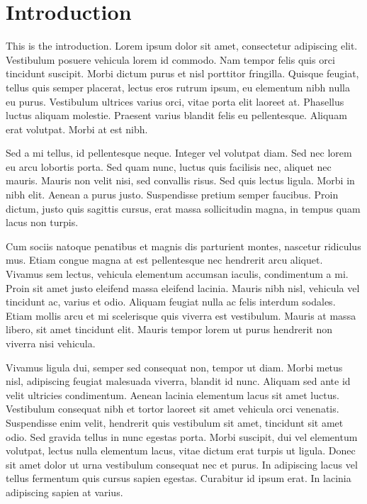\chapter{Introduction}

This is the introduction. Lorem ipsum dolor sit amet, consectetur adipiscing elit. Vestibulum posuere vehicula lorem id commodo. Nam tempor felis quis orci tincidunt suscipit. Morbi dictum purus et nisl porttitor fringilla. Quisque feugiat, tellus quis semper placerat, lectus eros rutrum ipsum, eu elementum nibh nulla eu purus. Vestibulum ultrices varius orci, vitae porta elit laoreet at. Phasellus luctus aliquam molestie. Praesent varius blandit felis eu pellentesque. Aliquam erat volutpat. Morbi at est nibh.

Sed a mi tellus, id pellentesque neque. Integer vel volutpat diam. Sed nec lorem eu arcu lobortis porta. Sed quam nunc, luctus quis facilisis nec, aliquet nec mauris. Mauris non velit nisi, sed convallis risus. Sed quis lectus ligula. Morbi in nibh elit. Aenean a purus justo. Suspendisse pretium semper faucibus. Proin dictum, justo quis sagittis cursus, erat massa sollicitudin magna, in tempus quam lacus non turpis.

Cum sociis natoque penatibus et magnis dis parturient montes, nascetur ridiculus mus. Etiam congue magna at est pellentesque nec hendrerit arcu aliquet. Vivamus sem lectus, vehicula elementum accumsan iaculis, condimentum a mi. Proin sit amet justo eleifend massa eleifend lacinia. Mauris nibh nisl, vehicula vel tincidunt ac, varius et odio. Aliquam feugiat nulla ac felis interdum sodales. Etiam mollis arcu et mi scelerisque quis viverra est vestibulum. Mauris at massa libero, sit amet tincidunt elit. Mauris tempor lorem ut purus hendrerit non viverra nisi vehicula.

Vivamus ligula dui, semper sed consequat non, tempor ut diam. Morbi metus nisl, adipiscing feugiat malesuada viverra, blandit id nunc. Aliquam sed ante id velit ultricies condimentum. Aenean lacinia elementum lacus sit amet luctus. Vestibulum consequat nibh et tortor laoreet sit amet vehicula orci venenatis. Suspendisse enim velit, hendrerit quis vestibulum sit amet, tincidunt sit amet odio. Sed gravida tellus in nunc egestas porta. Morbi suscipit, dui vel elementum volutpat, lectus nulla elementum lacus, vitae dictum erat turpis ut ligula. Donec sit amet dolor ut urna vestibulum consequat nec et purus. In adipiscing lacus vel tellus fermentum quis cursus sapien egestas. Curabitur id ipsum erat. In lacinia adipiscing sapien at varius.

